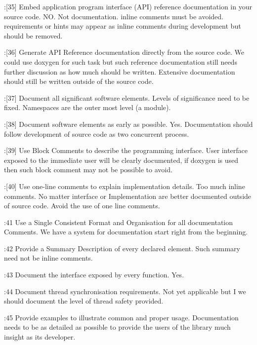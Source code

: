 \documentclass{book}
\begin{document}
\cite{OKL_MisfeldtBumgardnerGray2004CppStyle}:[35] Embed application program interface (API) reference documentation in your source code. NO. Not documentation. inline comments must be avoided. requirements or hints may appear as inline comments during development but should be  removed.

\cite{OKL_MisfeldtBumgardnerGray2004CppStyle}:[36] Generate API Reference documentation directly from the source code. We could use doxygen for such task but such reference documentation still needs further discussion as how much should be written. Extensive documentation should still be written outside of the source code.

\cite{OKL_MisfeldtBumgardnerGray2004CppStyle}:[37] Document all significant software elements. Levels of significance need to be fixed. Namespaces are the outer most level (a module).

\cite{OKL_MisfeldtBumgardnerGray2004CppStyle}:[38] Document software elements as early as possible. Yes. Documentation should follow development of source code as two concurrent process.

\cite{OKL_MisfeldtBumgardnerGray2004CppStyle}:[39] Use Block Comments to describe the programming interface. User interface exposed to the immediate user will be clearly documented, if doxygen is used then such block comment may not be possible to avoid. 

\cite{OKL_MisfeldtBumgardnerGray2004CppStyle}:[40] Use one-line comments to explain implementation details. Too much inline comments. No matter interface or Implementation are better documented outside of source code. Avoid the use of one line comments. 

\cite{OKL_MisfeldtBumgardnerGray2004CppStyle}:41 Use a Single Consistent Format and Organisation for all documentation Comments. We have a system for documentation start right from the beginning.

\cite{OKL_MisfeldtBumgardnerGray2004CppStyle}:42 Provide a Summary Description of every declared element. Such summary need not be inline comments.

\cite{OKL_MisfeldtBumgardnerGray2004CppStyle}:43 Document the interface exposed by every function. Yes.

\cite{OKL_MisfeldtBumgardnerGray2004CppStyle}:44 Document thread synchronisation requirements. Not yet applicable but I we should document the level of thread safety provided.

\cite{OKL_MisfeldtBumgardnerGray2004CppStyle}:45 Provide examples to illustrate common and proper usage. Documentation needs to be as detailed as possible to provide the users of the library much insight as its developer.
\end{document}
